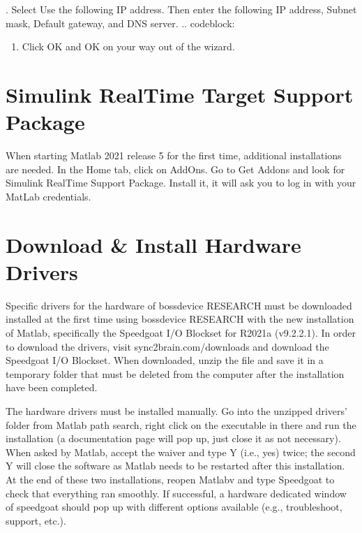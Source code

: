 \documentclass[letterpaper,10pt,english]{sphinxmanual}
\begin{document}
. Select Use the following IP address. Then enter the following IP address, Subnet mask, Default gateway, and DNS server.
.. code\sphinxhyphen{}block:

\begin{sphinxVerbatim}[commandchars=\\\{\}]
           
          
 
 
\end{sphinxVerbatim}
\begin{enumerate}
%
\setcounter{enumi}{5}
\item {} 
\sphinxAtStartPar
Click OK and OK on your way out of the wizard.

\end{enumerate}


\section{Simulink Real\sphinxhyphen{}Time Target Support Package}
\label{\detokenize{2_setup_bossdevice_research:simulink-real-time-target-support-package}}
\sphinxAtStartPar
When starting Matlab 2021 release 5 for the first time, additional installations are needed.
In the Home tab, click on Add\sphinxhyphen{}Ons. Go to Get Add\sphinxhyphen{}ons and look for Simulink Real\sphinxhyphen{}Time Support Package. Install it, it will ask you to log in with your MatLab credentials.


\section{Download \& Install Hardware Drivers}
\label{\detokenize{2_setup_bossdevice_research:download-install-hardware-drivers}}
\sphinxAtStartPar
Specific drivers for the hardware of bossdevice RESEARCH  must be downloaded installed at the first time using bossdevice RESEARCH with the new installation of Matlab, specifically the Speedgoat I/O Blockset for R2021a (v9.2.2.1). In order to download the drivers, visit sync2brain.com/downloads and download the Speedgoat I/O Blockset. When downloaded, unzip the file and save it in a temporary folder that must be deleted from the computer after the installation have been completed.

\sphinxAtStartPar
The hardware drivers must be installed manually. Go into the unzipped drivers’ folder from Matlab path search, right click on the executable in there and run the installation (a documentation page will pop up, just close it as not necessary). When asked by Matlab, accept the waiver and type Y (i.e., yes) twice; the second Y will close the software as Matlab needs to be restarted after this installation.
At the end of these two installations, reopen Matlabv and type Speedgoat to check that everything ran smoothly. If successful, a hardware dedicated window of speedgoat should pop up with different options available (e.g., troubleshoot, support, etc.).
\end{document}
